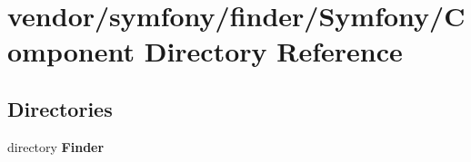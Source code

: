 \section{vendor/symfony/finder/\+Symfony/\+Component Directory Reference}
\label{dir_6d488e57117cc77dbd395e041e244fdc}
\subsection*{Directories}
\begin{DoxyCompactItemize}
\item 
directory {\bf Finder}
\end{DoxyCompactItemize}
